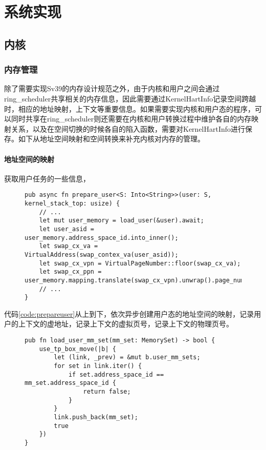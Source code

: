 \chapter{系统实现}
\label{chap:SystemImplement}

\section{内核}

\subsection{内存管理}

除了需要实现Sv39的内存设计规范之外，由于内核和用户之间会通过ring\_scheduler共享相关的内存信息，因此需要通过KernelHartInfo记录空间跨越时，相应的地址映射，上下文等重要信息。如果需要实现内核和用户态的程序，可以同时共享在ring\_scheduler则还需要在内核和用户转换过程中维护各自的内存映射关系，以及在空间切换的时候各自的陷入函数，需要对KernelHartInfo进行保存。如下从地址空间映射和空间转换来补充内核对内存的管理。

\subsubsection{地址空间的映射}

获取用户任务的一些信息， 
\begin{figure}[h]
\begin{lstlisting}[caption=用户任务信息获取, label=code:prepareuser]
pub async fn prepare_user<S: Into<String>>(user: S, kernel_stack_top: usize) {
    // ...
    let mut user_memory = load_user(&user).await;
    let user_asid = user_memory.address_space_id.into_inner();
    let swap_cx_va = VirtualAddress(swap_contex_va(user_asid));
    let swap_cx_vpn = VirtualPageNumber::floor(swap_cx_va);
    let swap_cx_ppn = user_memory.mapping.translate(swap_cx_vpn).unwrap().page_number();
    // ...
}
\end{lstlisting}
\end{figure}

代码\autoref{code:prepareuser}从上到下，依次异步创建用户态的地址空间的映射，记录用户的上下文的虚地址，记录上下文的虚拟页号，记录上下文的物理页号。
\begin{figure}[h]
\begin{lstlisting}[caption=向KernelHartInfo注入地址空间信息, label=code:loadusermmset]
pub fn load_user_mm_set(mm_set: MemorySet) -> bool {
    use_tp_box_move(|b| {
        let (link, _prev) = &mut b.user_mm_sets;
        for set in link.iter() {
            if set.address_space_id == mm_set.address_space_id {
                return false;
            }
        }
        link.push_back(mm_set);
        true
    })
}
\end{lstlisting}
\end{figure}

